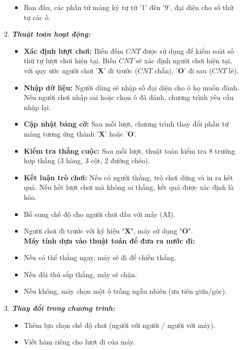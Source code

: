 \begin{enumerate}
\begin{enumerate}[label=\alph*]
\begin{itemize}
            \item Ban đầu, các phần tử mảng ký tự từ '1' đến '9', đại diện cho số thứ tự các ô.
        \end{itemize} 
        \item \textbf{\textit{Thuật toán hoạt động:}}
        \begin{itemize}
            \item \textbf{Xác định lượt chơi:} Biến đếm $CNT$ được sử dụng để kiểm soát số thứ tự lượt chơi hiện tại. Biến $CNT$ sẽ xác định người chơi hiện tại, với quy ước người chơi '\textbf{X}' đi trước ($CNT$ chẵn), '\textbf{O}' đi sau ($CNT$ lẻ).
            \item \textbf{Nhập dữ liệu:} Người dùng sẽ nhập số đại diện cho ô họ muốn đánh. Nếu người chơi nhập sai hoặc chọn ô đã đánh, chương trình yêu cầu nhập lại.
            \item \textbf{Cập nhật bảng cờ:} Sau mỗi lượt, chương trình thay đổi phần tử mảng tương ứng thành '\textbf{X}' hoặc '\textbf{O}'.
            \item \textbf{Kiểm tra thắng cuộc:} Sau mỗi lượt, thuật toán kiểm tra 8 trường hợp thắng (3 hàng, 3 cột, 2 đường chéo).
            \item \textbf{Kết luận trò chơi:} Nếu có người thắng, trò chơi dừng và in ra kết quả. Nếu hết lượt chơi mà không ai thắng, kết quả được xác định là hòa.
            \item Bổ sung chế độ cho người chơi đấu với máy (AI).
            \item Người chơi đi trước với ký hiệu "\textbf{X}", máy sử dụng "\textbf{O}".\\
            \textbf{Máy tính dựa vào thuật toán để đưa ra nước đi:}
            \item Nếu có thể thắng ngay, máy sẽ đi để chiến thắng.
            \item Nếu đối thủ sắp thắng, máy sẽ chặn.
            \item Nếu không, máy chọn một ô trống ngẫu nhiên (ưu tiên giữa/góc).
        \end{itemize} 
        \item \textbf{\textit{Thay đổi trong chương trình:}}
        \begin{itemize}
            \item Thêm lựa chọn chế độ chơi (người với người / người với máy).
            \item Viết hàm riêng cho lượt đi của máy.

\end{itemize}
\end{enumerate}
\end{enumerate}
